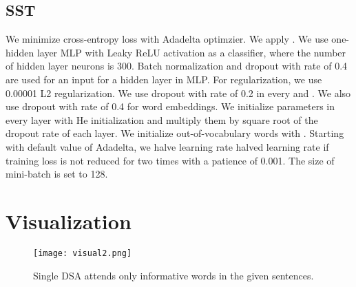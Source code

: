 \documentclass[11pt,a4paper]{article}
\begin{document}
\subsection{SST}
We minimize cross-entropy loss with Adadelta optimzier. We apply . We use one-hidden layer MLP with Leaky ReLU activation as a classifier, where the number of hidden layer neurons is 300. Batch normalization and dropout with rate of 0.4 are used for an input for a hidden layer in MLP. For regularization, we use 0.00001 L2 regularization. We use dropout with rate of 0.2 in every  and . We also use dropout with rate of 0.4 for word embeddings. We initialize parameters in every layer with He initialization and multiply them by square root of the dropout rate of each layer. We initialize out-of-vocabulary words with . Starting with default value of Adadelta, we halve learning rate halved learning rate if training loss is not reduced for two times with a patience of 0.001. The size of mini-batch is set to 128.




\section*{Visualization}


\begin{figure}[H]
        \texttt{[image: visual2.png]}
        \caption{Single DSA attends only informative words in the given sentences.}
\end{figure}
\end{document}

